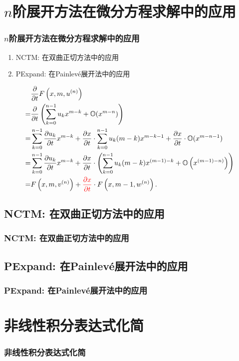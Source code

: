 \documentclass[serif]{beamer}
\newcommand{\sbrace}[1]{\left(#1\right)}
\newcommand{\up}[1]{^{(#1)}}
\newcommand{\OO}{\ensuremath{\mathbb O}}%
\newcommand{\DIF}[1]{\ensuremath{\frac{\partial}{\partial #1}}}
\newcommand{\DIFF}[2]{\ensuremath{\frac{\partial #1}{\partial #2}}}
\newcommand{\Painleve}{Painlev{\'e}}
\begin{document}
\section{$n$阶展开方法在微分方程求解中的应用}
\begin{frame}
\frametitle{$n$阶展开方法在微分方程求解中的应用}
\begin{enumerate}
\item NCTM: 在双曲正切方法中的应用
\item PExpand: 在\Painleve{}展开法中的应用
\end{enumerate}
\end{frame}

\begin{frame}
\begin{equation*}
\begin{split}
& \DIF{t}F\sbrace{x,m,u\up{n}}  \\
=& \DIF{t}\sbrace{\sum_{k=0}^{n-1}{u_k x^{m-k}}+\OO(x^{m-n})} \\
=& \sum_{k=0}^{n-1}{\DIFF{u_k}{t}x^{m-k}}+\DIFF{x}{t}\cdot\sum_{k=0}^{n-1}{u_k (m-k) x^{m-k-1}}+\DIFF{x}{t}\cdot\OO(x^{m-n-1}) \\
=& \sum_{k=0}^{n-1}{\DIFF{u_k}{t}x^{m-k}}+\DIFF{x}{t}\cdot\sbrace{\sum_{k=0}^{n-1}{u_k (m-k) x^{(m-1)-k}}+\OO\sbrace{x^{(m-1)-n)}}} \\ 
=& F\sbrace{x,m,v\up{n}}+{\color{red}\DIFF{x}{t}}\cdot F\sbrace{x,m-1,w\up{n}}.
\end{split}
\end{equation*}
\end{frame}

\subsection{NCTM: 在双曲正切方法中的应用}
\begin{frame}
\frametitle{NCTM: 在双曲正切方法中的应用}
\end{frame}

\subsection{PExpand: 在\Painleve{}展开法中的应用}
\begin{frame}
\frametitle{PExpand: 在\Painleve{}展开法中的应用}
\end{frame}

\section{非线性积分表达式化简}
\begin{frame}
\frametitle{非线性积分表达式化简}
\end{frame}
\end{document}
